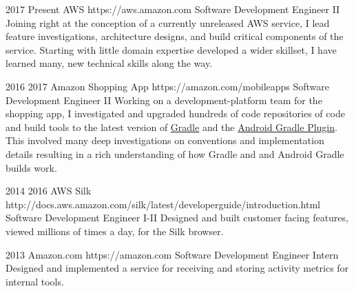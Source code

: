 \job
{2017} {Present}
{AWS} {https://aws.amazon.com}
{Software Development Engineer II}
{
    Joining right at the conception of a currently unreleased AWS service, I lead feature investigations, architecture designs, and build critical components of the service. Starting with little domain expertise developed a wider skillset, I have learned many, new technical skills along the way.
}

\job
{2016} {2017}
{Amazon Shopping App} {https://amazon.com/mobileapps}
{Software Development Engineer II}
{
    Working on a development-platform team for the shopping app, I investigated and upgraded hundreds of code repositories of code and build tools to the latest version of \href {https://gradle.org} {Gradle} and the \href {https://developer.android.com/studio/build/index.html} {Android Gradle Plugin}. This involved many deep investigations on conventions and implementation details resulting in a rich understanding of how Gradle and and Android Gradle builds work.
}

\job
{2014} {2016}
{AWS Silk} {http://docs.aws.amazon.com/silk/latest/developerguide/introduction.html}
{Software Development Engineer I-II}
{
    Designed and built customer facing features, viewed millions of times a day, for the Silk browser.
}

\job
{2013} {}
{Amazon.com} {https://amazon.com}
{Software Development Engineer Intern}
{
    Designed and implemented a service for receiving and storing activity metrics for internal tools.
}
